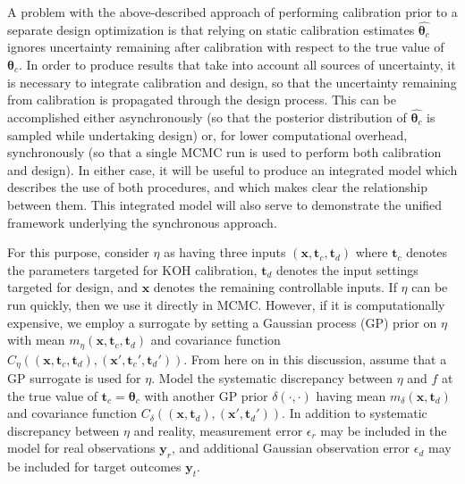 \documentclass[12pt]{article}
\begin{document}
%
A problem with the above-described approach of performing calibration prior to a separate design optimization is that relying on static calibration estimates $\widehat{\boldsymbol \theta_c}$ ignores uncertainty remaining after calibration with respect to the true value of $\boldsymbol\theta_c$.
%
In order to produce results that take into account all sources of uncertainty, it is necessary to integrate calibration and design, so that the uncertainty remaining from calibration is propagated through the design process.
%
This can be accomplished either asynchronously (so that the posterior distribution of $\widehat{\boldsymbol\theta_c}$ is sampled while undertaking design) or, for lower computational overhead, synchronously (so that a single MCMC run is used to perform both calibration and design).
%
In either case, it will be useful to produce an integrated model which describes the use of both procedures, and which makes clear the relationship between them.
%
This integrated model will also serve to demonstrate the unified framework underlying the synchronous approach.
%

%
For this purpose, consider $\eta$ as having three inputs $(\mathbf x,\mathbf t_c,\mathbf t_d)$ where $\mathbf t_c$ denotes the parameters targeted for KOH calibration, $\mathbf t_d$ denotes the input settings targeted for design, and $\mathbf x$ denotes the remaining controllable inputs.
%
If $\eta$ can be run quickly, then we use it directly in MCMC.
%
However, if it is computationally expensive, we employ a surrogate by setting a Gaussian process (GP) prior on $\eta$ with mean $m_\eta(\mathbf x,\mathbf t_c,\mathbf t_d)$ and covariance function $C_\eta((\mathbf x,\mathbf t_c,\mathbf t_d),(\mathbf x',\mathbf t_c',\mathbf t_d'))$.
%
From here on in this discussion, assume that a GP surrogate is used for $\eta$.
%
Model the systematic discrepancy between $\eta$ and $f$ at the true value of $\mathbf t_c=\boldsymbol\theta_c$ with another GP prior $\delta(\cdot,\cdot)$ having mean $m_\delta(\mathbf x,\mathbf t_d)$ and covariance function $C_\delta((\mathbf x,\mathbf t_d),(\mathbf x',\mathbf t_d'))$.
%
In addition to systematic discrepancy between $\eta$ and reality, measurement error $\epsilon_r$ may be included in the model for real observations $\mathbf y_r$, and additional Gaussian observation error $\epsilon_d$ may be included for target outcomes $\mathbf y_t$.
%
\end{document}
